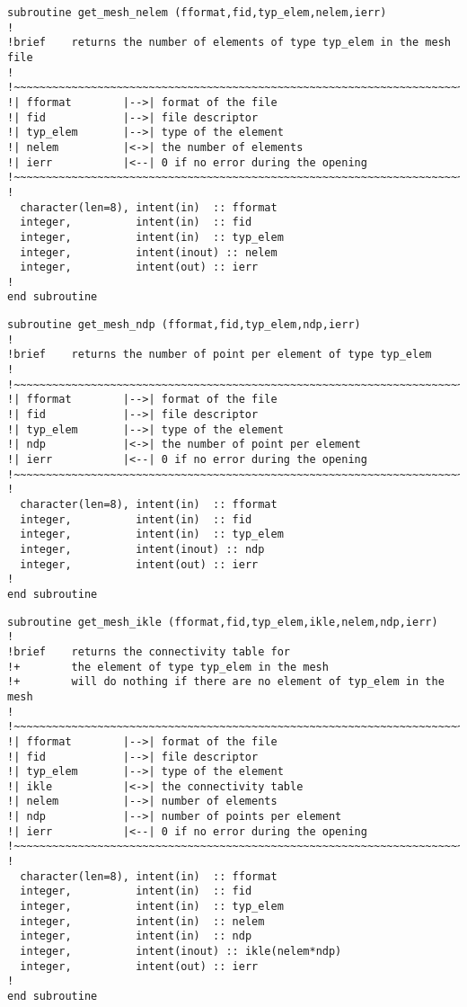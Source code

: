 %
\begin{lstlisting}
subroutine get_mesh_nelem (fformat,fid,typ_elem,nelem,ierr)
!
!brief    returns the number of elements of type typ_elem in the mesh file
!
!~~~~~~~~~~~~~~~~~~~~~~~~~~~~~~~~~~~~~~~~~~~~~~~~~~~~~~~~~~~~~~~~~~~~~~~
!| fformat        |-->| format of the file
!| fid            |-->| file descriptor
!| typ_elem       |-->| type of the element
!| nelem          |<->| the number of elements
!| ierr           |<--| 0 if no error during the opening
!~~~~~~~~~~~~~~~~~~~~~~~~~~~~~~~~~~~~~~~~~~~~~~~~~~~~~~~~~~~~~~~~~~~~~~~
!
  character(len=8), intent(in)  :: fformat
  integer,          intent(in)  :: fid
  integer,          intent(in)  :: typ_elem
  integer,          intent(inout) :: nelem
  integer,          intent(out) :: ierr
!
end subroutine
\end{lstlisting}
%
\begin{lstlisting}
subroutine get_mesh_ndp (fformat,fid,typ_elem,ndp,ierr)
!
!brief    returns the number of point per element of type typ_elem
!
!~~~~~~~~~~~~~~~~~~~~~~~~~~~~~~~~~~~~~~~~~~~~~~~~~~~~~~~~~~~~~~~~~~~~~~~
!| fformat        |-->| format of the file
!| fid            |-->| file descriptor
!| typ_elem       |-->| type of the element
!| ndp            |<->| the number of point per element
!| ierr           |<--| 0 if no error during the opening
!~~~~~~~~~~~~~~~~~~~~~~~~~~~~~~~~~~~~~~~~~~~~~~~~~~~~~~~~~~~~~~~~~~~~~~~
!
  character(len=8), intent(in)  :: fformat
  integer,          intent(in)  :: fid
  integer,          intent(in)  :: typ_elem
  integer,          intent(inout) :: ndp
  integer,          intent(out) :: ierr
!
end subroutine
\end{lstlisting}
%
\begin{lstlisting}
subroutine get_mesh_ikle (fformat,fid,typ_elem,ikle,nelem,ndp,ierr)
!
!brief    returns the connectivity table for 
!+        the element of type typ_elem in the mesh
!+        will do nothing if there are no element of typ_elem in the mesh
!
!~~~~~~~~~~~~~~~~~~~~~~~~~~~~~~~~~~~~~~~~~~~~~~~~~~~~~~~~~~~~~~~~~~~~~~~
!| fformat        |-->| format of the file
!| fid            |-->| file descriptor
!| typ_elem       |-->| type of the element
!| ikle           |<->| the connectivity table
!| nelem          |-->| number of elements
!| ndp            |-->| number of points per element
!| ierr           |<--| 0 if no error during the opening
!~~~~~~~~~~~~~~~~~~~~~~~~~~~~~~~~~~~~~~~~~~~~~~~~~~~~~~~~~~~~~~~~~~~~~~~
!
  character(len=8), intent(in)  :: fformat
  integer,          intent(in)  :: fid
  integer,          intent(in)  :: typ_elem
  integer,          intent(in)  :: nelem
  integer,          intent(in)  :: ndp
  integer,          intent(inout) :: ikle(nelem*ndp)
  integer,          intent(out) :: ierr
!
end subroutine
\end{lstlisting}
